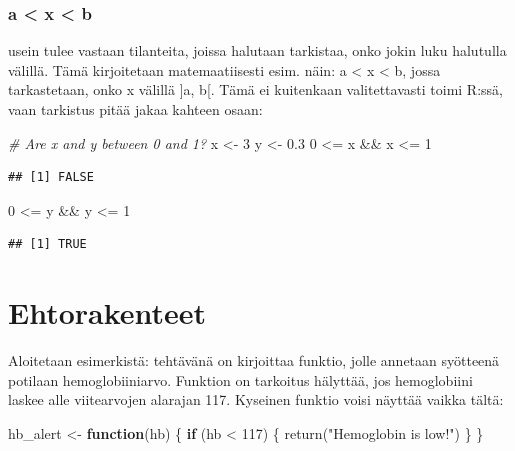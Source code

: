 \documentclass[
]{book}
\newenvironment{Shaded}{\begin{snugshade}}{\end{snugshade}}
\newcommand{\CommentTok}[1]{\textcolor[rgb]{0.56,0.35,0.01}{\textit{#1}}}
\newcommand{\ControlFlowTok}[1]{\textcolor[rgb]{0.13,0.29,0.53}{\textbf{#1}}}
\newcommand{\DecValTok}[1]{\textcolor[rgb]{0.00,0.00,0.81}{#1}}
\newcommand{\FloatTok}[1]{\textcolor[rgb]{0.00,0.00,0.81}{#1}}
\newcommand{\FunctionTok}[1]{\textcolor[rgb]{0.00,0.00,0.00}{#1}}
\newcommand{\NormalTok}[1]{#1}
\newcommand{\OtherTok}[1]{\textcolor[rgb]{0.56,0.35,0.01}{#1}}
\newcommand{\SpecialCharTok}[1]{\textcolor[rgb]{0.00,0.00,0.00}{#1}}
\newcommand{\StringTok}[1]{\textcolor[rgb]{0.31,0.60,0.02}{#1}}
\begin{document}
\hypertarget{a-x-b}{%
\subsubsection{a \textless{} x \textless{} b}\label{a-x-b}}

usein tulee vastaan tilanteita, joissa halutaan tarkistaa, onko jokin luku halutulla välillä. Tämä kirjoitetaan matemaatiisesti esim. näin: a \textless{} x \textless{} b, jossa tarkastetaan, onko x välillä {]}a, b{[}. Tämä ei kuitenkaan valitettavasti toimi R:ssä, vaan tarkistus pitää jakaa kahteen osaan:

\begin{Shaded}
\begin{Highlighting}[]
\CommentTok{\# Are x and y between 0 and 1?}
\NormalTok{x }\OtherTok{\textless{}{-}} \DecValTok{3}
\NormalTok{y }\OtherTok{\textless{}{-}} \FloatTok{0.3}
\DecValTok{0} \SpecialCharTok{\textless{}=}\NormalTok{ x }\SpecialCharTok{\&\&}\NormalTok{ x }\SpecialCharTok{\textless{}=} \DecValTok{1}
\end{Highlighting}
\end{Shaded}

\begin{verbatim}
## [1] FALSE
\end{verbatim}

\begin{Shaded}
\begin{Highlighting}[]
\DecValTok{0} \SpecialCharTok{\textless{}=}\NormalTok{ y }\SpecialCharTok{\&\&}\NormalTok{ y }\SpecialCharTok{\textless{}=} \DecValTok{1}
\end{Highlighting}
\end{Shaded}

\begin{verbatim}
## [1] TRUE
\end{verbatim}

\hypertarget{ehtorakenteet}{%
\section{Ehtorakenteet}\label{ehtorakenteet}}

Aloitetaan esimerkistä: tehtävänä on kirjoittaa funktio, jolle annetaan syötteenä potilaan hemoglobiiniarvo. Funktion on tarkoitus hälyttää, jos hemoglobiini laskee alle viitearvojen alarajan 117. Kyseinen funktio voisi näyttää vaikka tältä:

\begin{Shaded}
\begin{Highlighting}[]
\NormalTok{hb\_alert }\OtherTok{\textless{}{-}} \ControlFlowTok{function}\NormalTok{(hb) \{}
  \ControlFlowTok{if}\NormalTok{ (hb }\SpecialCharTok{\textless{}} \DecValTok{117}\NormalTok{) \{}
    \FunctionTok{return}\NormalTok{(}\StringTok{"Hemoglobin is low!"}\NormalTok{)}
\NormalTok{  \}}
\NormalTok{\}}
\end{Highlighting}
\end{Shaded}
\end{document}
